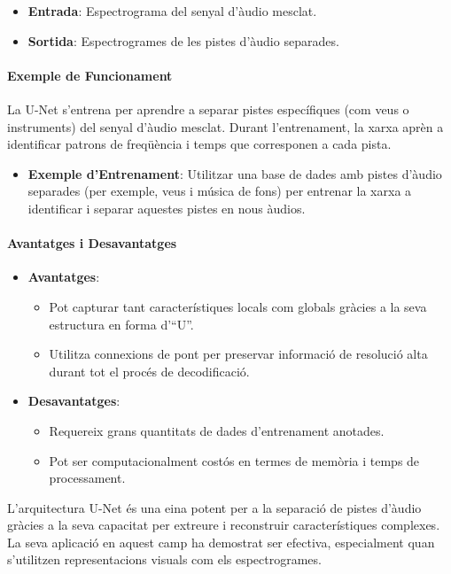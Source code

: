 \documentclass[10pt,a4paper,twocolumn,twoside]{article}
\begin{document}
\begin{itemize}
    \item \textbf{Entrada}: Espectrograma del senyal d'àudio mesclat.
    \item \textbf{Sortida}: Espectrogrames de les pistes d'àudio separades.
\end{itemize}

\paragraph{Exemple de Funcionament}
La U-Net s'entrena per aprendre a separar pistes específiques (com veus o instruments) del senyal d'àudio mesclat. Durant l'entrenament, la xarxa aprèn a identificar patrons de freqüència i temps que corresponen a cada pista.

\begin{itemize}
    \item \textbf{Exemple d'Entrenament}: Utilitzar una base de dades amb pistes d'àudio separades (per exemple, veus i música de fons) per entrenar la xarxa a identificar i separar aquestes pistes en nous àudios.
\end{itemize}

\paragraph{Avantatges i Desavantatges}
\begin{itemize}
    \item \textbf{Avantatges}:
        \begin{itemize}
            \item Pot capturar tant característiques locals com globals gràcies a la seva estructura en forma d'``U''.
            \item Utilitza connexions de pont per preservar informació de resolució alta durant tot el procés de decodificació.
        \end{itemize}
    \item \textbf{Desavantatges}:
        \begin{itemize}
            \item Requereix grans quantitats de dades d'entrenament anotades.
            \item Pot ser computacionalment costós en termes de memòria i temps de processament.
        \end{itemize}
    \end{itemize}

L'arquitectura U-Net és una eina potent per a la separació de pistes d'àudio gràcies a la seva capacitat per extreure i reconstruir característiques complexes. La seva aplicació en aquest camp ha demostrat ser efectiva, especialment quan s'utilitzen representacions visuals com els espectrogrames.
\end{document}
